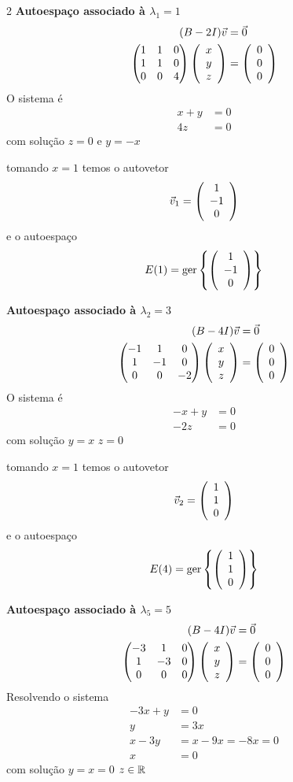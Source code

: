 \documentclass[a4paper,12pt,fleqn]{article}
\begin{document}
\begin{answer}
\begin{multicols}{2}
\textbf{Autoespaço associado à $\lambda_1=1$}
  \begin{align*}
    (B-2I)\vec{v} & = \vec{0} \\
    \begin{pmatrix}
      1 & 1 & 0 \\
      1 & 1 & 0 \\
      0 & 0 & 4
    \end{pmatrix}
    \left(\begin{array}{c} x \\ y \\ z \end{array}\right) & = \left(\begin{array}{c} 0 \\ 0 \\ 0 \end{array}\right)
  \end{align*}
  O sistema é
  \begin{align*}
    x + y & = 0 \\
    4z & = 0
  \end{align*}
  com solução
  \(
    z=0
  \) e
  \(
    y=-x
  \)

  tomando $x=1$ temos o autovetor
  \[
    \vec{v}_1 = \left(\begin{array}{c} 1 \\ -1 \\ 0 \end{array}\right)
  \]
  e o autoespaço
  \[
    E(1) = \operatorname{ger} \left\{ \left(\begin{array}{c} 1 \\ -1 \\ 0 \end{array}\right) \right\}
  \]

\bigskip
\textbf{Autoespaço associado à $\lambda_2=3$}
  \begin{align*}
    (B-4I)\vec{v} & = \vec{0} \\
    \begin{pmatrix}
      -1 &  1  &  0  \\
       1 & -1  &  0  \\
       0 &  0  & -2
    \end{pmatrix}
    \left(\begin{array}{c} x \\ y \\ z \end{array}\right) & = \left(\begin{array}{c} 0 \\ 0 \\ 0 \end{array}\right)
  \end{align*}
  O sistema é
  \begin{align*}
    -x + y & = 0 \\
    -2z & = 0
  \end{align*}
  com solução
  \(
    y = x
  \)
  \(
    z = 0
  \)

  tomando $x=1$ temos o autovetor
  \[
    \vec{v}_2 = \left(\begin{array}{c} 1 \\ 1 \\ 0 \end{array}\right)
  \]
  e o autoespaço
  \[
    E(4) = \operatorname{ger} \left\{ \left(\begin{array}{c} 1 \\ 1 \\ 0 \end{array}\right) \right\}
  \]


\bigskip
\textbf{Autoespaço associado à $\lambda_5=5$}
  \begin{align*}
    (B-4I)\vec{v} & = \vec{0} \\
    \begin{pmatrix}
      -3 &  1  & 0  \\
       1 & -3  & 0  \\
       0 &  0  & 0
    \end{pmatrix}
    \left(\begin{array}{c} x \\ y \\ z \end{array}\right) & = \left(\begin{array}{c} 0 \\ 0 \\ 0 \end{array}\right)
  \end{align*}
  Resolvendo o sistema
  \begin{align*}
    -3x + y & = 0  \\
    y       & = 3x
    \\[5mm]
    x - 3y  & = x - 9x = -8x = 0 \\
    x & = 0
  \end{align*}
  com solução
  \(
    y = x = 0
  \)
  \(
    z \in \mathbb{R}
  \)


\end{multicols}
\end{answer}
\end{document}
